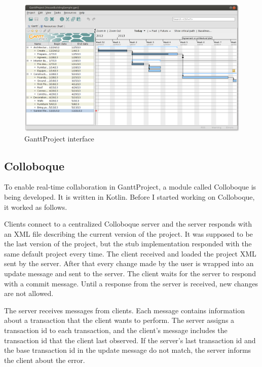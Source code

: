 \documentclass[a4paper, 11pt, oneside]{article}
\theoremstyle{definition}
\begin{document}
\begin{figure}
    \includegraphics[width=\linewidth]{img/ganttproject.png}
    \caption{GanttProject interface}
    \label{fig:ganttscreen}
\end{figure}

\subsection{Colloboque}
To enable real-time collaboration in GanttProject, a module called Colloboque is being developed. It is written in Kotlin. Before I started working on Colloboque, it worked as follows.

Clients connect to a centralized Colloboque server and the server responds with an XML file describing the current version of the project. It was supposed to be the last version of the project, but the stub implementation responded with the same default project every time. The client received and loaded the project XML sent by the server. After that every change made by the user is wrapped into an update message and sent to the server. The client waits for the server to respond with a commit message. Until a response from the server is received, new changes are not allowed. 


The server receives messages from clients. Each message contains information about a transaction that the client wants to perform. The server assigns a transaction id to each transaction, and the client's message includes the transaction id that the client last observed. If the server's last transaction id and the base transaction id in the update message do not match, the server informs the client about the error.
\end{document}
